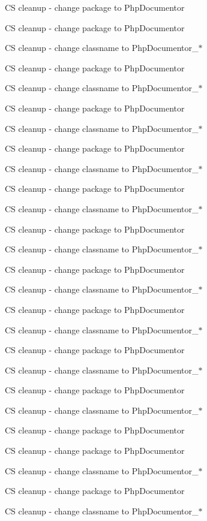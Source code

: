 \begin{DoxyRefList}
\-C\-S cleanup -\/ change package to \-Php\-Documentor 

\-C\-S cleanup -\/ change package to \-Php\-Documentor 

\-C\-S cleanup -\/ change classname to \-Php\-Documentor\-\_\-$\ast$ 

\-C\-S cleanup -\/ change package to \-Php\-Documentor 

\-C\-S cleanup -\/ change classname to \-Php\-Documentor\-\_\-$\ast$ 

\-C\-S cleanup -\/ change package to \-Php\-Documentor 

\-C\-S cleanup -\/ change classname to \-Php\-Documentor\-\_\-$\ast$ 

\-C\-S cleanup -\/ change package to \-Php\-Documentor 

\-C\-S cleanup -\/ change classname to \-Php\-Documentor\-\_\-$\ast$ 

\-C\-S cleanup -\/ change package to \-Php\-Documentor 

\-C\-S cleanup -\/ change classname to \-Php\-Documentor\-\_\-$\ast$ 

\-C\-S cleanup -\/ change package to \-Php\-Documentor 

\-C\-S cleanup -\/ change classname to \-Php\-Documentor\-\_\-$\ast$ 

\-C\-S cleanup -\/ change package to \-Php\-Documentor 

\-C\-S cleanup -\/ change classname to \-Php\-Documentor\-\_\-$\ast$ 

\-C\-S cleanup -\/ change package to \-Php\-Documentor 

\-C\-S cleanup -\/ change classname to \-Php\-Documentor\-\_\-$\ast$ 

\-C\-S cleanup -\/ change package to \-Php\-Documentor 

\-C\-S cleanup -\/ change classname to \-Php\-Documentor\-\_\-$\ast$ 

\-C\-S cleanup -\/ change package to \-Php\-Documentor 

\-C\-S cleanup -\/ change classname to \-Php\-Documentor\-\_\-$\ast$ 

\-C\-S cleanup -\/ change package to \-Php\-Documentor 

\-C\-S cleanup -\/ change package to \-Php\-Documentor 

\-C\-S cleanup -\/ change classname to \-Php\-Documentor\-\_\-$\ast$ 

\-C\-S cleanup -\/ change package to \-Php\-Documentor 

\-C\-S cleanup -\/ change classname to \-Php\-Documentor\-\_\-$\ast$ 


\end{DoxyRefList}
